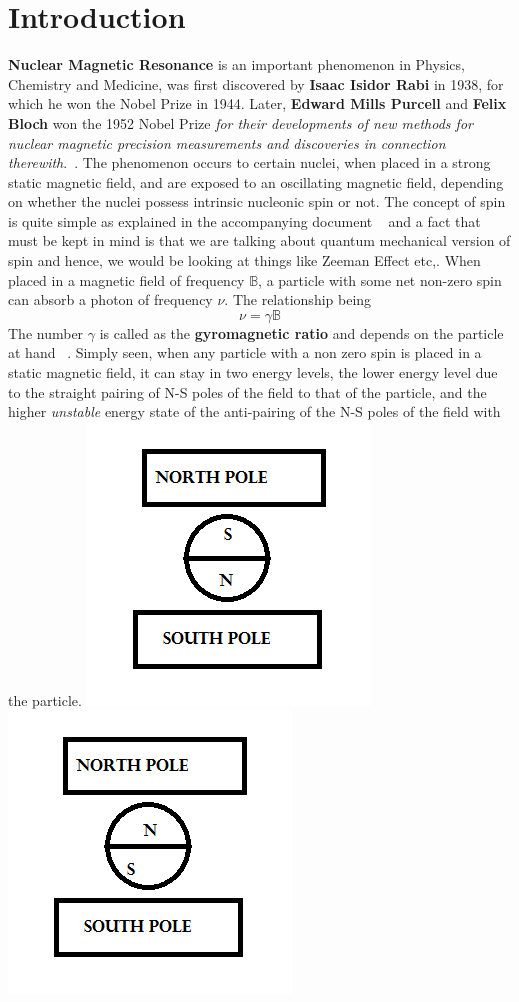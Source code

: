\documentclass[12pt]{article}
\begin{document}
\section{Introduction}
\textbf{Nuclear Magnetic Resonance} is an important phenomenon in Physics, Chemistry and Medicine, was first discovered by \textbf{Isaac Isidor Rabi} in 1938, for which he won the Nobel Prize in 1944. Later, \textbf{Edward Mills Purcell} and \textbf{Felix Bloch} won the 1952 Nobel Prize \textit{for their developments of new methods for nuclear magnetic precision measurements and discoveries in connection therewith}.~\cite{npb}. The phenomenon occurs to certain nuclei, when placed in a strong static magnetic field, and are exposed to an oscillating magnetic field, depending on whether the nuclei possess intrinsic nucleonic spin or not. The concept of spin is quite simple as explained in the accompanying document ~\cite{me} and a fact that must be kept in mind is that we are talking about quantum mechanical version of spin and hence, we would be looking at things like Zeeman Effect etc,. When placed in a magnetic field of frequency $\mathbb{B}$, a particle with some net non-zero spin can absorb a photon of frequency $\nu$. The relationship being $$\nu = \gamma\mathbb{B}$$ The number $\gamma$ is called as the \textbf{gyromagnetic ratio} and depends on the particle at hand ~\cite{jph}. Simply seen, when any particle with a non zero spin is placed in a static magnetic field, it can stay in two energy levels, the lower energy level due to the straight pairing of N-S poles of the field to that of the particle, and the higher \textit{unstable} energy state of the anti-pairing of the N-S poles of the field with the particle.
\includegraphics[scale=0.9]{nsns.png}
\includegraphics[scale=0.9]{nnss.png}
\end{document}

